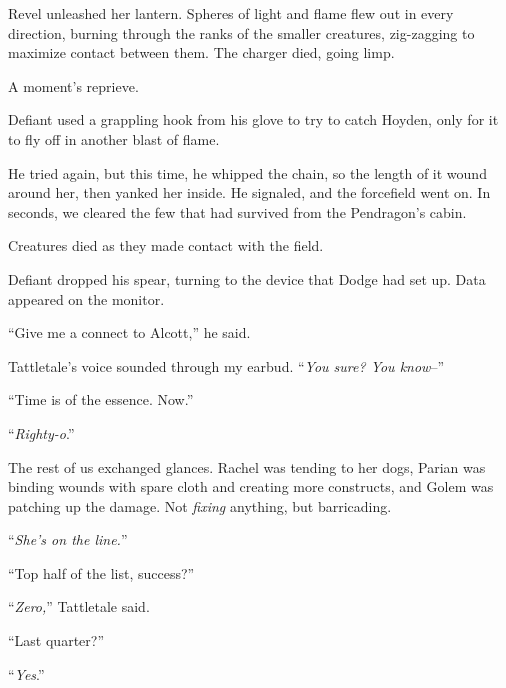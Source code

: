 Revel unleashed her lantern.  Spheres of light and flame flew out in every direction, burning through the ranks of the smaller creatures, zig-zagging to maximize contact between them.  The charger died, going limp.



A moment's reprieve.



Defiant used a grappling hook from his glove to try to catch Hoyden, only for it to fly off in another blast of flame.



He tried again, but this time, he whipped the chain, so the length of it wound around her, then yanked her inside.  He signaled, and the forcefield went on.  In seconds, we cleared the few that had survived from the Pendragon's cabin.



Creatures died as they made contact with the field.



Defiant dropped his spear, turning to the device that Dodge had set up.  Data appeared on the monitor.



``Give me a connect to Alcott,'' he said.



Tattletale's voice sounded through my earbud.  ``\emph{You sure?  You know}--''



``Time is of the essence.  Now.''



``\emph{Righty-o}.''



The rest of us exchanged glances.  Rachel was tending to her dogs, Parian was binding wounds with spare cloth and creating more constructs, and Golem was patching up the damage.  Not \emph{fixing} anything, but barricading.



``\emph{She's on the line.}''



``Top half of the list, success?''



``\emph{Zero,}'' Tattletale said.



``Last quarter?''



``\emph{Yes}.''



